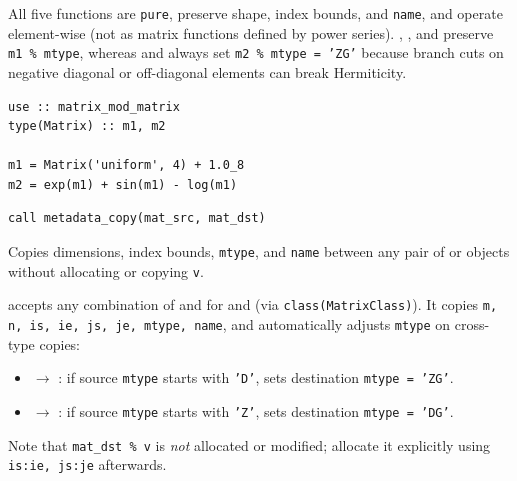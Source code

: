 All five functions are \texttt{pure}, preserve shape, index bounds, and \texttt{name}, and operate element-wise (not as matrix functions defined by power series). , , and  preserve \texttt{m1 \% mtype}, whereas  and  always set \texttt{m2 \% mtype = 'ZG'} because branch cuts on negative diagonal or off-diagonal elements can break Hermiticity.

\begin{description}[leftmargin=2.2cm, style=nextline]
\end{description}

\lstset{language=[95]Fortran}
\begin{lstlisting}
use :: matrix_mod_matrix
type(Matrix) :: m1, m2

m1 = Matrix('uniform', 4) + 1.0_8
m2 = exp(m1) + sin(m1) - log(m1)
\end{lstlisting}



\lstset{language=[95]Fortran}
\begin{lstlisting}
call metadata_copy(mat_src, mat_dst)
\end{lstlisting}

Copies dimensions, index bounds, \texttt{mtype}, and \texttt{name} between any pair of  or  objects without allocating or copying \texttt{v}.

 accepts any combination of  and  for  and  (via \texttt{class(MatrixClass)}). It copies \texttt{m, n, is, ie, js, je, mtype, name}, and automatically adjusts \texttt{mtype} on cross-type copies:
\begin{itemize}
  \item {} $\to$ : if source \texttt{mtype} starts with \texttt{'D'}, sets destination \texttt{mtype = 'ZG'}.
  \item {} $\to$ : if source \texttt{mtype} starts with \texttt{'Z'}, sets destination \texttt{mtype = 'DG'}.
\end{itemize}
Note that \texttt{mat\_dst \% v} is \emph{not} allocated or modified; allocate it explicitly using \texttt{is:ie, js:je} afterwards.


